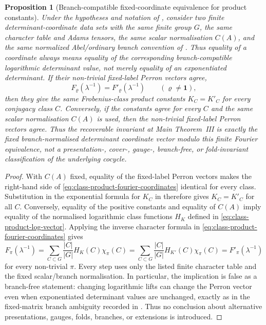 \documentclass[11pt,a4paper]{amsart}
\theoremstyle{plain}
\newtheorem{proposition}[theorem]{Proposition}
\theoremstyle{definition}
\theoremstyle{remark}
\begin{document}
\begin{proposition}[Branch-compatible fixed-coordinate equivalence for product constants]
  \label{prop:class-product-fixed-coordinate-equivalence}
  Under the hypotheses and notation of
  , consider two finite
  determinant-coordinate data sets with the same finite group \(G\), the same
  character table and Adams tensors, the same scalar normalisation \(C(A)\),
  and the same normalized Abel/ordinary branch convention of
  .  Thus equality of a coordinate
  always means equality of the corresponding branch-compatible logarithmic
  determinant value, not merely equality of an exponentiated determinant.  If
  their non-trivial fixed-label Perron vectors agree,
  \[
    F_\varrho(\lambda^{-1})=F'_\varrho(\lambda^{-1})
    \qquad(\varrho\ne\mathbf1),
  \]
  then they give the same Frobenius-class product constants \(K_C=K'_C\) for
  every conjugacy class \(C\).  Conversely, if the constants agree for every
  \(C\) and the same scalar normalisation \(C(A)\) is used, then the
  non-trivial fixed-label Perron vectors agree.  Thus the recoverable invariant
  at Main Theorem~III is exactly the fixed branch-normalised determinant
  coordinate vector modulo this finite Fourier equivalence, not a
  presentation-, cover-, gauge-, branch-free, or fold-invariant classification
  of the underlying cocycle.
\end{proposition}

\begin{proof}
  With \(C(A)\) fixed, equality of the fixed-label Perron vectors makes the
  right-hand side of \eqref{eq:class-product-fourier-coordinates} identical for
  every class.  Substitution in the exponential formula for \(K_C\) in
   therefore gives
  \(K_C=K'_C\) for all \(C\).  Conversely, equality of the positive constants
  and equality of \(C(A)\) imply equality of the normalised logarithmic class
  functions \(H_K\) defined in \eqref{eq:class-product-log-vector}.  Applying
  the inverse character formula in
  \eqref{eq:class-product-fourier-coordinates} gives
  \[
    F_\pi(\lambda^{-1})
    =\sum_{C\subset G}\frac{|C|}{|G|}H_K(C)\chi_\pi(C)
    =\sum_{C\subset G}\frac{|C|}{|G|}H_{K'}(C)\chi_\pi(C)
    =F'_\pi(\lambda^{-1})
  \]
  for every non-trivial \(\pi\).  Every step uses only the listed finite
  character table and the fixed scalar/branch normalisation.  In particular,
  the implication is false as a branch-free statement: changing logarithmic
  lifts can change the Perron vector even when exponentiated determinant
  values are unchanged, exactly as in the fixed-matrix branch ambiguity
  recorded in .  Thus no conclusion
  about alternative presentations, gauges, folds, branches, or extensions is
  introduced.
\end{proof}
\end{document}
